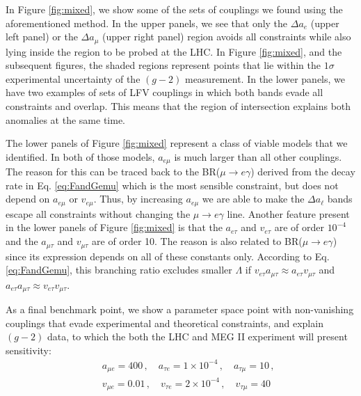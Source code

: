 \documentclass[prd,amsfonts,onecolumn,superscriptaddress,aps,nofootinbib,11pt]{revtex4-1}
\begin{document}
In Figure \ref{fig:mixed}, we show some of the sets of couplings we found using the aforementioned method. In the upper panels, we see that only the $\Delta a_e$ (upper left panel) or the $\Delta a_\mu$ (upper right panel) region avoids all constraints while also lying inside the region to be probed at the LHC. In Figure \ref{fig:mixed}, and the subsequent figures, the shaded regions represent points that lie within the $1\sigma$ experimental uncertainty of the $(g-2)$ measurement. In the lower panels, we have two examples of sets of LFV couplings in which both bands evade all constraints and overlap. This means that the region of intersection explains both anomalies at the same time.

The lower panels of Figure \ref{fig:mixed} represent a class of viable models that we identified. In both of those models, $a_{e \mu}$ is much larger than all other couplings. The reason for this can be traced back to the BR($\mu \to e \gamma$) derived from the decay rate in Eq. \eqref{eq:FandGemu} which is the most sensible constraint, but does not depend on $a_{e \mu}$ or $v_{e \mu}$. Thus, by increasing $a_{e \mu}$ we are able to make the $\Delta a_\ell$ bands escape all constraints without changing the $\mu \to e \gamma$ line. Another feature present in the lower panels of Figure \ref{fig:mixed} is that the $a_{e \tau}$ and $v_{e \tau}$ are of order $10^{-4}$ and the $a_{\mu \tau}$ and $v_{\mu \tau}$ are of order 10. The reason is also related to BR($\mu \to e \gamma$) since its expression depends on all of these constants only. According to Eq. \eqref{eq:FandGemu}, this branching ratio excludes smaller $\Lambda$ if $v_{e \tau} a_{\mu \tau} \approx a_{e \tau} v_{\mu \tau}$ and $a_{e \tau} a_{\mu \tau} \approx v_{e \tau} v_{\mu \tau}$.

As a final benchmark point, we show a parameter space point with non-vanishing couplings that evade experimental and theoretical constraints, and explain $(g-2)$ data, to which the both the LHC and MEG II experiment will present sensitivity: %
\begin{eqnarray}
\label{eq:lfv-consts-final}
&& a_{\mu e} = 400 \,, \quad a_{\tau e} = 1 \times 10^{-4} \,, \quad a_{\tau \mu} = 10\,, \nonumber \\
&& v_{\mu e} = 0.01 \,, \quad v_{\tau e} = 2 \times 10^{-4} \,, \quad v_{\tau \mu} = 40       
\end{eqnarray}
\end{document}
